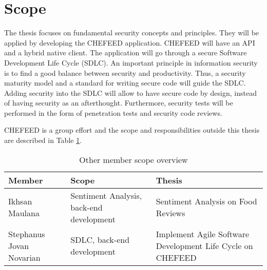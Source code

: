 \section{Scope}
The thesis focuses on fundamental security concepts and principles. They will be applied by developing the CHEFEED application. CHEFEED will have an API and a hybrid native client. The application will go through a secure Software Development Life Cycle (SDLC). An important principle in information security is to find a good balance between security and productivity. Thus, a security maturity model and a standard for writing secure code will guide the SDLC. Adding security into the SDLC will allow to have secure code by design, instead of having security as an afterthought. Furthermore, security tests will be performed in the form of penetration tests and security code reviews.

CHEFEED is a group effort and the scope and responsibilities outside this thesis are described in Table \ref{tab:member-scope}.

\begin{table}[!h]
    \centering
    \caption{Other member scope overview}
    \label{tab:member-scope}
    \begin{tabular}{|l|p{10em}|p{12em}|}
        \hline
        \textbf{Member} & \textbf{Scope} & \textbf{Thesis} \\
        \hline
        Ikhsan Maulana & Sentiment Analysis, back-end development & Sentiment Analysis on Food Reviews \\
        \hline
        Stephanus Jovan Novarian & SDLC, back-end development & Implement Agile Software Development Life Cycle on CHEFEED \\
        \hline
    \end{tabular}
\end{table}
